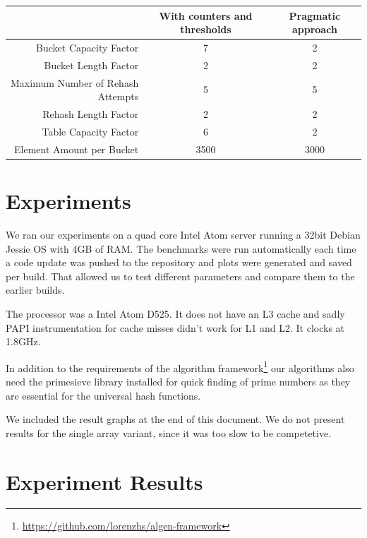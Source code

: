 \documentclass{article}
\begin{document}
\begin{center}
\begin{tabulary}{0.95\textwidth}{R|C|C}
& With counters \newline and thresholds & Pragmatic approach \\ 
\hline Bucket Capacity Factor & 7 & 2 \\ 
\hline Bucket Length Factor & 2 & 2 \\ 
\hline Maximum Number of Rehash Attempts & 5 & 5 \\ 
\hline Rehash Length Factor & 2 & 2 \\ 
\hline Table Capacity Factor & 6 & 2 \\ 
\hline Element Amount per Bucket & 3500 & 3000 \\
\end{tabulary}
\end{center}

\section{Experiments}

We ran our experiments on a quad core Intel Atom server running a 32bit Debian
Jessie OS with 4GB of RAM. The benchmarks were run automatically each time a
code update was pushed to the repository and plots were generated and saved per
build. That allowed us to test different parameters and compare them to the
earlier builds.

The processor was a Intel Atom D525. It does not have an L3 cache and sadly PAPI
instrumentation for cache misses didn't work for L1 and L2. It clocks at 1.8GHz.

In addition to the requirements of the algorithm
framework\footnote{\href{https://github.com/lorenzhs/algen-framework}{https://github.com/lorenzhs/algen-framework}}
our algorithms also need the primesieve library installed for quick finding of
prime numbers as they are essential for the universal hash functions.

We included the result graphs at the end of this document. We do not present
results for the single array variant, since it was too slow to be competetive.\\

\printbibliography

\section*{Experiment Results}
\end{document}
